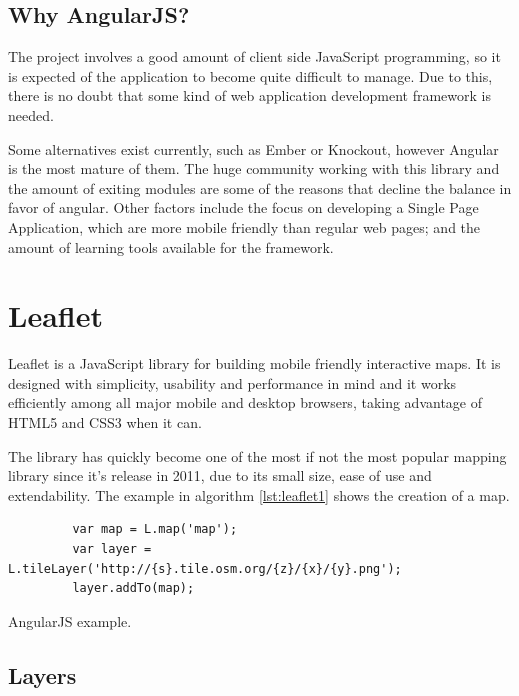 \subsection*{Why AngularJS?}

The project involves a good amount of client side JavaScript programming, so it is expected of the application to become quite difficult to manage. Due to this, there is no doubt that some kind of web application development framework is needed.

Some alternatives exist currently, such as Ember or Knockout, however Angular is the most mature of them. The huge community working with this library and the amount of exiting modules are some of the reasons that decline the balance in favor of angular. Other factors include the focus on developing a Single Page Application, which are more mobile friendly than regular web pages; and the amount of learning tools available for the framework. 

\section{Leaflet}\label{sec:leaflet}

Leaflet is a JavaScript library for building mobile friendly interactive maps. It is designed with simplicity, usability and performance in mind and it works efficiently among all major mobile and desktop browsers, taking advantage of HTML5 and CSS3 when it can\cite{leafletjs}.

The library has quickly become one of the most if not the most popular mapping library since it's release in 2011, due to its small size, ease of use and extendability. The example in algorithm \ref{lst:leaflet1} shows the creation of a map.

\begin{listing}\centering
  \begin{minipage}{.8\textwidth}
    \begin{verbatim}
	     var map = L.map('map');
	     var layer = L.tileLayer('http://{s}.tile.osm.org/{z}/{x}/{y}.png');
	     layer.addTo(map);
    \end{verbatim}
  \end{minipage}
  \caption{AngularJS example.}\label{lst:leaflet1}
\end{listing}

\subsection*{Layers}

